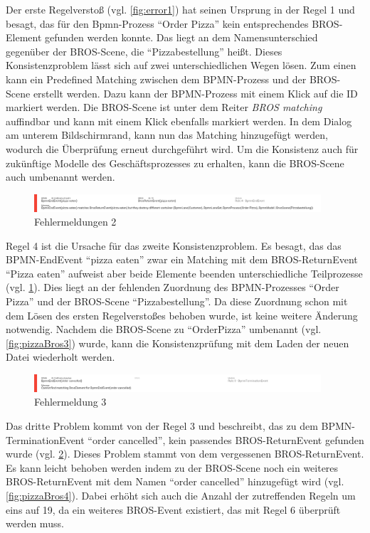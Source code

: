 Der erste Regelverstoß (vgl. \cref{fig:error1}) hat seinen Ursprung in der Regel 1 und besagt, das für den Bpmn-Prozess ``Order Pizza'' kein entsprechendes BROS-Element gefunden werden konnte.
Das liegt an dem Namensunterschied gegenüber der BROS-Scene, die ``Pizzabestellung'' heißt.
Dieses Konsistenzproblem lässt sich auf zwei unterschiedlichen Wegen lösen.
Zum einen kann ein Predefined Matching zwischen dem BPMN-Prozess und der BROS-Scene erstellt werden.
Dazu kann der BPMN-Prozess mit einem Klick auf die ID markiert werden.
Die BROS-Scene ist unter dem Reiter \emph{BROS matching} auffindbar und kann mit einem Klick ebenfalls markiert werden.
In dem Dialog am unterem Bildschirmrand, kann nun das Matching hinzugefügt werden, wodurch die Überprüfung erneut durchgeführt wird.
Um die Konsistenz auch für zukünftige Modelle des Geschäftsprozesses zu erhalten, kann die BROS-Scene auch umbenannt werden.

\begin{figure}[H]
    \centering
     \includegraphics[width=0.95\textwidth,keepaspectratio]{../images/example/error2.png}%
    \caption{Fehlermeldungen 2}%
    \label{fig:error2}
\end{figure}

Regel 4 ist die Ursache für das zweite Konsistenzproblem.
Es besagt, das das BPMN-EndEvent ``pizza eaten'' zwar ein Matching mit dem BROS-ReturnEvent ``Pizza  eaten'' aufweist aber beide Elemente beenden unterschiedliche Teilprozesse (vgl. \cref{fig:error2}).
Dies liegt an der fehlenden Zuordnung des BPMN-Prozesses ``Order Pizza'' und der BROS-Scene ``Pizzabestellung''.
Da diese Zuordnung schon mit dem Lösen des ersten Regelverstoßes behoben wurde, ist keine weitere Änderung notwendig.
Nachdem die BROS-Scene zu ``OrderPizza'' umbenannt (vgl. \cref{fig:pizzaBros3}) wurde, kann die Konsistenzprüfung mit dem Laden der neuen Datei wiederholt werden.

\begin{figure}[H]
    \centering
    \includegraphics[width=0.95\textwidth,keepaspectratio]{../images/example/error3.png}%
    \caption{Fehlermeldung 3}%
    \label{fig:error3}
\end{figure}

Das dritte Problem kommt von der Regel 3 und beschreibt, das zu dem BPMN-TerminationEvent ``order cancelled'', kein passendes BROS-ReturnEvent gefunden wurde (vgl. \cref{fig:error3}).
Dieses Problem stammt von dem vergessenen BROS-ReturnEvent.
Es kann leicht behoben werden indem zu der BROS-Scene noch ein weiteres BROS-ReturnEvent mit dem Namen ``order cancelled'' hinzugefügt wird (vgl. \cref{fig:pizzaBros4}). 
Dabei erhöht sich auch die Anzahl der zutreffenden Regeln um eins auf 19, da ein weiteres BROS-Event existiert, das mit Regel 6 überprüft werden muss.

